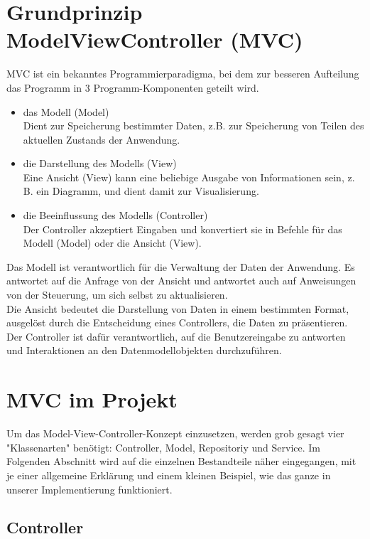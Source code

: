 \documentclass[12pt,a4paper]{article}
\begin{document}
\section{Grundprinzip ModelViewController (MVC)}
MVC ist ein bekanntes Programmierparadigma, bei dem zur besseren Aufteilung das Programm in 3 Programm-Komponenten geteilt wird.
\begin{itemize}
	\item das Modell (Model)\\
	Dient zur Speicherung bestimmter Daten, z.B. zur Speicherung von Teilen des aktuellen Zustands der Anwendung.
	\item die Darstellung des Modells (View)\\
	Eine Ansicht (View) kann eine beliebige Ausgabe von Informationen sein, z. B. ein Diagramm, und dient damit zur Visualisierung.
	\item die Beeinflussung des Modells (Controller)\\
	Der Controller akzeptiert Eingaben und konvertiert sie in Befehle für das Modell (Model) oder die Ansicht (View).
\end{itemize}
Das Modell ist verantwortlich für die Verwaltung der Daten der Anwendung. Es antwortet auf die Anfrage von der Ansicht und antwortet auch auf Anweisungen von der Steuerung, um sich selbst zu aktualisieren.\\
Die Ansicht bedeutet die Darstellung von Daten in einem bestimmten Format, ausgelöst durch die Entscheidung eines Controllers, die Daten zu präsentieren.\\
Der Controller ist dafür verantwortlich, auf die Benutzereingabe zu antworten und Interaktionen an den Datenmodellobjekten durchzuführen.





\section{MVC im Projekt}

Um das Model-View-Controller-Konzept einzusetzen, werden grob gesagt vier "Klassenarten"{} benötigt: Controller, Model, Repositoriy und Service. Im Folgenden Abschnitt wird auf die einzelnen Bestandteile näher eingegangen, mit je einer allgemeine Erklärung und einem kleinen Beispiel, wie das ganze in unserer Implementierung funktioniert.


\subsection{Controller}
\end{document}
